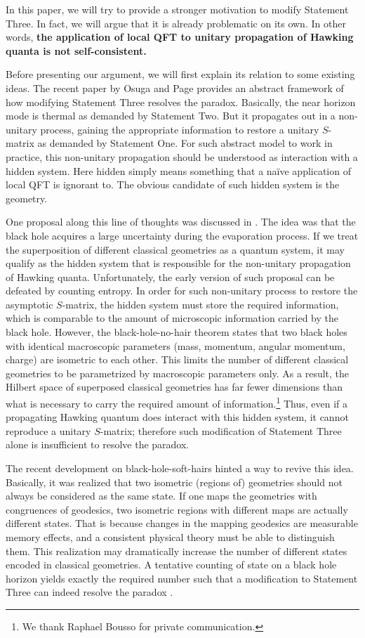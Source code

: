 \documentclass[aps,showpacs,onecolumn,floats,prd,superscriptaddress,nofootinbib]{revtex4-1}
\begin{document}
In this paper, we will try to provide a stronger motivation to modify Statement Three. 
In fact, we will argue that it is already problematic on its own. 
In other words, {\bf the application of local QFT to unitary propagation of Hawking quanta is not self-consistent. } 

Before presenting our argument, we will first explain its relation to some existing ideas.
The recent paper by Osuga and Page \cite{OsuPag16} provides an abstract framework of how modifying Statement Three resolves the paradox.
Basically, the near horizon mode is thermal as demanded by Statement Two.
But it propagates out in a non-unitary process, gaining the appropriate information to restore a unitary $S$-matrix as demanded by Statement One. 
For such abstract model to work in practice, this non-unitary propagation should be understood as interaction with a hidden system.
Here hidden simply means something that a na\"ive application of local QFT is ignorant to.
The obvious candidate of such hidden system is the geometry.

One proposal along this line of thoughts was discussed in \cite{NomVar12}. 
The idea was that the black hole acquires a large uncertainty during the evaporation process. 
If we treat the superposition of different classical geometries as a quantum system, it may qualify as the hidden system that is responsible for the non-unitary propagation of Hawking quanta. 
Unfortunately, the early version of such proposal can be defeated by counting entropy.
In order for such non-unitary process to restore the asymptotic $S$-matrix, the hidden system must store the required information, which is comparable to the amount of microscopic information carried by the black hole.
However, the black-hole-no-hair theorem states that two black holes with identical macroscopic parameters (mass, momentum, angular momentum, charge) are isometric to each other. 
This limits the number of different classical geometries to be parametrized by macroscopic parameters only.
As a result, the Hilbert space of superposed classical geometries has far fewer dimensions than what is necessary to carry the required amount of information.\footnote{We thank Raphael Bousso for private communication.}
Thus, even if a propagating Hawking quantum does interact with this hidden system, it cannot reproduce a unitary $S$-matrix; therefore such modification of Statement Three alone is insufficient to resolve the paradox.

The recent development on black-hole-soft-hairs \cite{HawPer16} hinted a way to revive this idea.
Basically, it was realized that two isometric (regions of) geometries should not always be considered as the same state.
If one maps the geometries with congruences of geodesics, two isometric regions with different maps are actually different states.
That is because changes in the mapping geodesics are measurable memory effects, and a consistent physical theory must be able to distinguish them.
This realization may dramatically increase the number of different states encoded in classical geometries.
A tentative counting of state on a black hole horizon yields exactly the required number such that a modification to Statement Three can indeed resolve the paradox \cite{HawPer16}.
\end{document}
